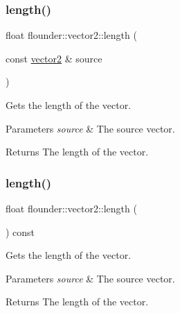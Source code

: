 \subsubsection{\texorpdfstring{length()}{length()}\hspace{0.1cm}{\footnotesize\ttfamily [1/2]}}
{\footnotesize\ttfamily float flounder\+::vector2\+::length (\begin{DoxyParamCaption}\item[{const \hyperlink{classflounder_1_1vector2}{vector2} \&}]{source }\end{DoxyParamCaption})\hspace{0.3cm}{\ttfamily [static]}}



Gets the length of the vector. 


\begin{DoxyParams}{Parameters}
{\em source} & The source vector. \\
\hline
\end{DoxyParams}
\begin{DoxyReturn}{Returns}
The length of the vector. 
\end{DoxyReturn}
\mbox{\label{classflounder_1_1vector2_af91b7aff4d835eef17da4ae9aa715058}} 
\subsubsection{\texorpdfstring{length()}{length()}\hspace{0.1cm}{\footnotesize\ttfamily [2/2]}}
{\footnotesize\ttfamily float flounder\+::vector2\+::length (\begin{DoxyParamCaption}{ }\end{DoxyParamCaption}) const}



Gets the length of the vector. 


\begin{DoxyParams}{Parameters}
{\em source} & The source vector. \\
\hline
\end{DoxyParams}
\begin{DoxyReturn}{Returns}
The length of the vector. 
\end{DoxyReturn}
\mbox{\label{classflounder_1_1vector2_a3cb46839794e2b997814a5a84ffcbde6}} 
